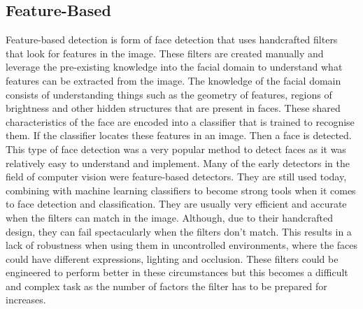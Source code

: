 \documentclass{l4proj}
\begin{document}
\subsection{Feature-Based}
\label{featurebased}
 Feature-based detection is form of face detection that uses handcrafted filters that look for features in the image. These filters are created manually and leverage the pre-existing knowledge into the facial domain to understand what features can be extracted from the image. The knowledge of the facial domain consists of understanding things such as the geometry of features, regions of brightness and other hidden structures that are present in faces. These shared characteristics of the face are encoded into a classifier that is trained to recognise them. If the classifier locates these features in an image. Then a face is detected. This type of face detection was a very popular method to detect faces as it was relatively easy to understand and implement. Many of the early detectors in the field of computer vision were feature-based detectors. They are still used today, combining with machine learning classifiers to become strong tools when it comes to face detection and classification. They are usually very efficient and accurate when the filters can match in the image. Although, due to their handcrafted design, they can fail spectacularly when the filters don't match. This results in a lack of robustness when using them in uncontrolled environments, where the faces could have different expressions, lighting and occlusion. These filters could be engineered to perform better in these circumstances but this becomes a difficult and complex task as the number of factors the filter has to be prepared for increases. 
\end{document}
